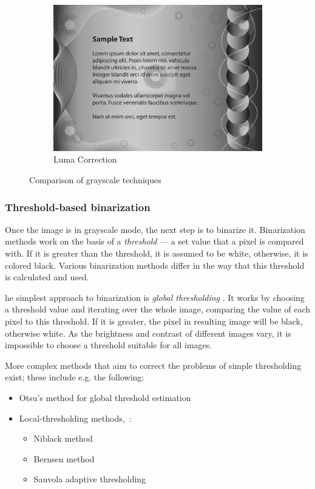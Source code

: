 \begin{figure}[t]
\begin{subfigure}{0.31\textwidth}
\includegraphics[width=\linewidth]{img/preprocessing/grayscale_luma.png}
\caption{Luma Correction}\label{fig:1c}
\end{subfigure}
\caption{Comparison of grayscale techniques} \label{fig:1}
\end{figure}

\subsubsection{Threshold-based binarization}
Once the image is in grayscale mode, the next step is to binarize it. Binarization methods work on the basis of a \emph{threshold} --- a set value that a pixel is compared with. If it is greater than the threshold, it is assumed to be white, otherwise, it is colored black. Various binarization methods differ in the way that this threshold is calculated and used.

he simplest approach to binarization is \emph{global thresholding} \citep{globalThresh}. It works by choosing a threshold value and iterating over the whole image, comparing the value of each pixel to this threshold. If it is greater, the pixel in resulting image will be black, otherwise white. As the brightness and contrast of different images vary, it is impossible to choose a threshold suitable for all images.

More complex methods that aim to correct the problems of simple thresholding exist; these include e.g. the following:
\begin{itemize}
\item Otsu's method for global threshold estimation
\item Local-thresholding methods,~\citep{localOtherBin}:
\begin{itemize}
\item Niblack method
\item Bernsen method
\item Sauvola adaptive thresholding
\end{itemize}
\end{itemize}

